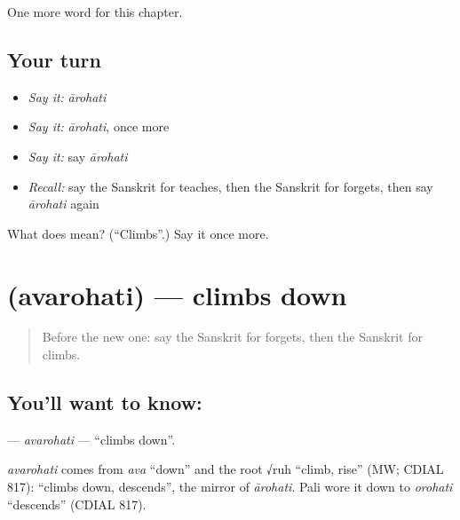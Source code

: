 \begin{grammarlens}[title={What you've built}]
One more word for this chapter.
\end{grammarlens}

\subsection*{Your turn}
\begin{itemize}
\raggedright
  \item \emph{Say it:} \emph{ārohati}
  \item \emph{Say it:} \emph{ārohati}, once more
  \item \emph{Say it:} say \emph{ārohati}
  \item \emph{Recall:} say the Sanskrit for teaches, then the Sanskrit for forgets, then say \emph{ārohati} again
\end{itemize}

\begin{tcolorbox}[breakable,colback=teal!4,colframe=teal!35!black,title={Before you move on}]
What does  mean? (\textquotedblleft{}Climbs\textquotedblright{}.) Say it once more.
\end{tcolorbox}
\section[\texorpdfstring{\sk{अवरोहति} (avarohati)}{अवरोहति (avarohati)}]{ (avarohati) — climbs down}

\label{lesson:SA-C135-avarohati}



\begin{quote}
Before the new one: say the Sanskrit for forgets, then the Sanskrit for climbs.
\end{quote}

\subsection*{You'll want to know: }
\textbf{} — \emph{avarohati} — \textquotedblleft{}climbs down\textquotedblright{}.

\begin{cousinweb}
\emph{avarohati} comes from \emph{ava} \textquotedblleft{}down\textquotedblright{} and the root √ruh \textquotedblleft{}climb, rise\textquotedblright{} (MW; CDIAL 817): \textquotedblleft{}climbs down, descends\textquotedblright{}, the mirror of \emph{ārohati}. Pali wore it down to \emph{orohati} \textquotedblleft{}descends\textquotedblright{} (CDIAL 817).
\end{cousinweb}

